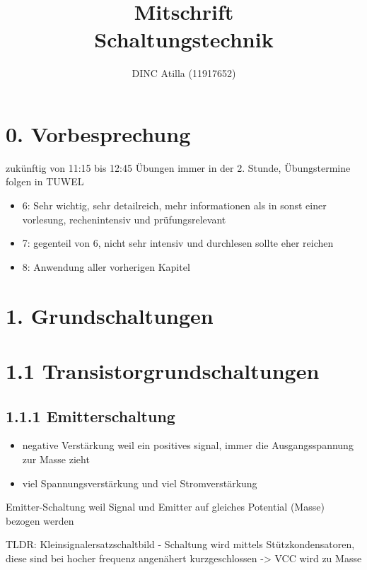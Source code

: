 \documentclass[a5paper]{article}
\title{Mitschrift\\Schaltungstechnik}
\author{DINC Atilla (11917652)}
\begin{document}
\normalsize
\maketitle


\section*{0. Vorbesprechung}

zukünftig von 11:15 bis 12:45\newline
Übungen immer in der 2. Stunde, Übungstermine folgen in TUWEL

\begin{itemize}
    \item 6: Sehr wichtig, sehr detailreich, mehr informationen als in sonst einer vorlesung, rechenintensiv und prüfungsrelevant
    \item 7: gegenteil von 6, nicht sehr intensiv und durchlesen sollte eher reichen
    \item 8: Anwendung aller vorherigen Kapitel
\end{itemize}

\section*{1. Grundschaltungen}
\section*{1.1 Transistorgrundschaltungen}
\subsection*{1.1.1 Emitterschaltung}
\begin{itemize}
    \item negative Verstärkung weil ein positives signal, immer die Ausgangsspannung zur Masse zieht
    \item viel Spannungsverstärkung und viel Stromverstärkung
\end{itemize}

Emitter-Schaltung weil Signal und Emitter auf gleiches Potential (Masse) bezogen werden

TLDR: Kleinsignalersatzschaltbild - Schaltung wird mittels Stützkondensatoren,
diese sind bei hocher frequenz angenähert kurzgeschlossen -> VCC wird zu Masse
\end{document}
